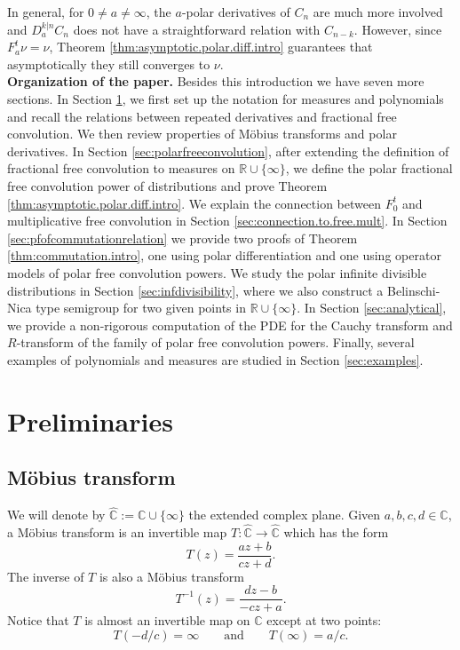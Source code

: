 \documentclass[reqno,11pt]{amsart}
\theoremstyle{remark}
\newcommand{\cc}{\mathbb{C}}
\newcommand{\rr}{\mathbb{R}}
\newcommand{\polars}[3]{D_{#1}^{#2|#3}}
\newcommand{\pfreepower}[2]{F_{#1}^{#2}}
\begin{document}
In general, for $0\neq a\neq \infty$, the $a$-polar derivatives of $C_n$ are much more involved and $\polars{a}{k}{n}C_n$ does not have a straightforward relation with $ C_{n-k} $. However, since $ \pfreepower{a}{t}\nu =\nu$, Theorem \ref{thm:asymptotic.polar.diff.intro} guarantees that asymptotically they still converges to $ \nu $.\\

\textbf{Organization of the paper.} Besides this introduction we have seven more sections. In Section \ref{sec:prelim}, we first set up the notation for measures and polynomials and recall the relations between repeated derivatives and fractional free convolution. We then review properties of Möbius transforms and polar derivatives. In Section \ref{sec:polarfreeconvolution}, after extending the definition of fractional free convolution to measures on $ \rr\cup \{\infty\}$, we define the polar fractional free convolution power of distributions and prove Theorem \ref{thm:asymptotic.polar.diff.intro}. We explain the connection between $\pfreepower{0}{t}$ and multiplicative free convolution in Section \ref{sec:connection.to.free.mult}. In Section \ref{sec:pfofcommutationrelation} we provide two proofs of Theorem \ref{thm:commutation.intro}, one using polar differentiation and one using operator models of polar free convolution powers. We study the polar infinite divisible distributions in Section \ref{sec:infdivisibility}, where we also construct a Belinschi-Nica type semigroup for two given points in $\rr\cup \{\infty\}$. In Section \ref{sec:analytical}, we provide a non-rigorous computation of the PDE for the Cauchy transform and $R$-transform of the family of polar free convolution powers. Finally, several examples of polynomials and measures are studied in Section \ref{sec:examples}.


\section{Preliminaries}
\label{sec:prelim}

\subsection{Möbius transform}
We will denote by $\hat{\cc}:=\cc \cup \{\infty\}$ the extended complex plane. Given $a,b,c,d\in\cc$, a Möbius transform is an invertible map $T: \hat{\cc}\to \hat{\cc}$ which has the form
$$ T(z) = \frac{az+b}{cz+d}.$$
The inverse of $T$ is also a Möbius transform 
$$T^{-1}(z)= \frac{dz-b}{-cz+a}.$$
Notice that $T$ is almost an invertible map on $\cc$ except at two points:
$$T(-d/c)=\infty \qquad \text{and} \qquad T(\infty) = a/c.$$
\end{document}
